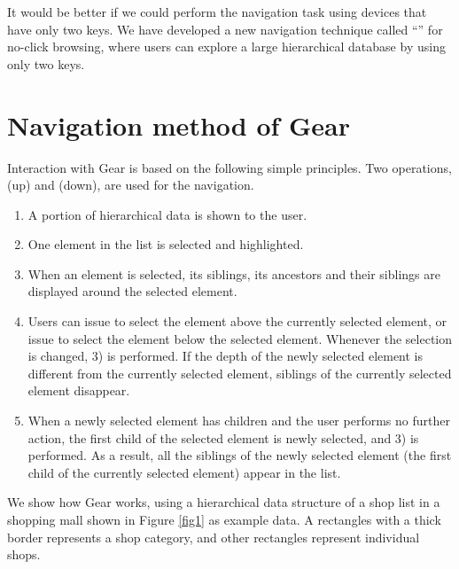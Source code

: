 \documentclass[conference]{IEEEtran}
\def\up{\tsf{▲}}
\def\down{\tsf{▼}}
\begin{document}
It would be better
if we could perform the navigation task using devices that have only two keys.
%
We have developed a new navigation technique called ``'' for no-click browsing,
where users can explore a large hierarchical database by using only two keys.


\section{Navigation method of Gear}
\label{navigation}

Interaction with Gear is based on the following simple principles.
Two operations,
{\up} (up) and {\down} (down), are used for the navigation.

\begin{enumerate}
\item A portion of hierarchical data is shown to the user.

\item One element in the list is selected and highlighted.


\item When an element is selected, its siblings, its ancestors and their siblings are displayed
around the selected element.

\item Users can issue {\up} to select the element above the currently selected element,
or issue {\down} to select the element below the selected element.
Whenever the selection is changed, 3) is performed.
If the depth of the newly selected element is different from the currently
selected element, siblings of the currently selected element disappear.

\item When a newly selected element has children and the user performs no further action,
the first child of the selected element is newly selected, and 3) is performed.
As a result, all the siblings of the newly selected element
(the first child of the currently selected element) appear in the list.

\end{enumerate}

We show how Gear works, using a hierarchical data structure of
a shop list in a shopping mall shown in Figure \ref{fig1} as example data.
A rectangles with a thick border represents a shop category, and
other rectangles represent individual shops.
\end{document}
